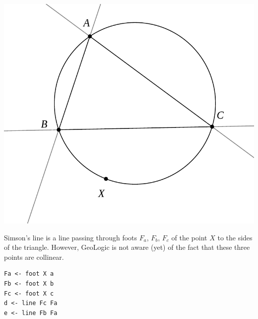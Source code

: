 \documentclass[runningheads]{llncs}
\begin{document}
\newdimen\imgwidth
\imgwidth=5cm
\centerline{%
  \includegraphics[width = \imgwidth]{simson1.pdf}%
}

Simson's line is a line passing through foots $F_a$, $F_b$, $F_c$ of
the point $X$ to the sides of the triangle. However, GeoLogic is not
aware (yet) of the fact that these three points are collinear.

\begin{verbatim}
Fa <- foot X a
Fb <- foot X b
Fc <- foot X c
d <- line Fc Fa
e <- line Fb Fa
\end{verbatim}
\end{document}
